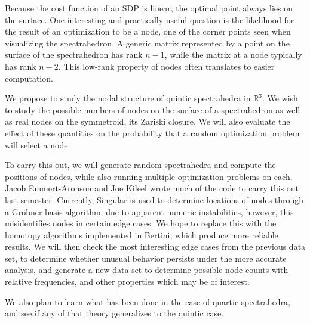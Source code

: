 \documentclass[12pt]{amsart}
\begin{document}
Because the cost function of an SDP is linear, the optimal point
always lies on the surface.  One interesting and practically useful
question is the likelihood for the result of an optimization to be a
node, one of the corner points seen when visualizing the
spectrahedron.  A generic matrix represented by a point on the surface
of the spectrahedron has rank $n-1$, while the matrix at a node
typically has rank $n-2$.  This low-rank property of nodes often
translates to easier computation.

We propose to study the nodal structure of quintic spectrahedra in
$\mathbb{R}^3$.  We wish to study the possible numbers of nodes on the
surface of a spectrahedron as well as real nodes on the symmetroid,
its Zariski closure.  We will also evaluate the effect of these
quantities on the probability that a random optimization problem will
select a node.

To carry this out, we will generate random spectrahedra and compute
the positions of nodes, while also running multiple optimization
problems on each.  Jacob Emmert-Aronson and Joe Kileel wrote much of
the code to carry this out last semester.  Currently, Singular is used
to determine locations of nodes through a Gr\"obner basis algorithm;
due to apparent numeric instabilities, however, this misidentifies
nodes in certain edge cases.  We hope to replace this with the
homotopy algorithms implemented in Bertini, which produce more
reliable results.  We will then check the most interesting edge cases
from the previous data set, to determine whether unusual behavior
persists under the more accurate analysis, and generate a new data set
to determine possible node counts with relative frequencies, and other
properties which may be of interest.

We also plan to learn what has been done in the case of quartic spectrahedra,
and see if any of that theory generalizes to the quintic case.




\nocite{*}
\end{document}
